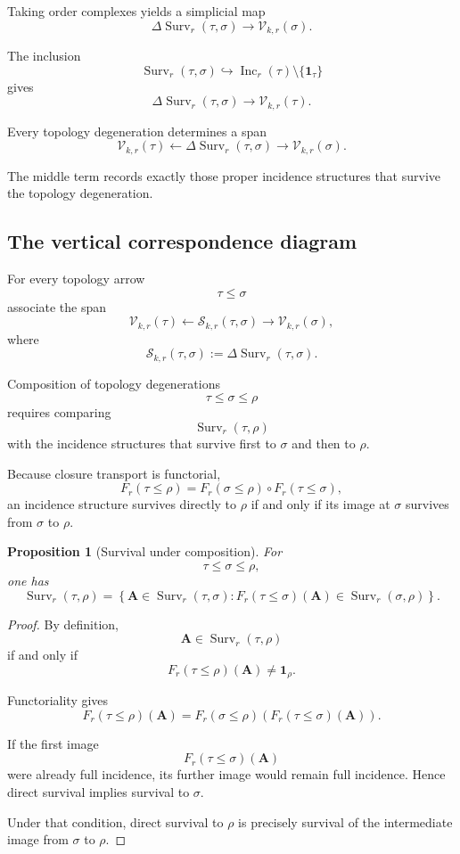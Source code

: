 \documentclass[11pt]{article}
\theoremstyle{plain}
\newtheorem{proposition}[theorem]{Proposition}
\theoremstyle{definition}
\begin{document}
Taking order complexes yields a simplicial map
\[
\Delta\operatorname{Surv}_r(\tau,\sigma)
\longrightarrow
\mathcal V_{k,r}(\sigma).
\]

The inclusion
\[
\operatorname{Surv}_r(\tau,\sigma)
\hookrightarrow
\operatorname{Inc}_r(\tau)
\setminus
\{\mathbf1_\tau\}
\]
gives
\[
\Delta\operatorname{Surv}_r(\tau,\sigma)
\longrightarrow
\mathcal V_{k,r}(\tau).
\]

Every topology degeneration determines a span
\[
\mathcal V_{k,r}(\tau)
\longleftarrow
\Delta\operatorname{Surv}_r(\tau,\sigma)
\longrightarrow
\mathcal V_{k,r}(\sigma).
\]

The middle term records exactly those proper incidence structures that survive the
topology degeneration.


\subsection{The vertical correspondence diagram}
\label{subsec:vertical-correspondence-diagram}


For every topology arrow
\[
\tau\leq\sigma
\]
associate the span
\[
\mathcal V_{k,r}(\tau)
\longleftarrow
\mathcal S_{k,r}(\tau,\sigma)
\longrightarrow
\mathcal V_{k,r}(\sigma),
\]
where
\[
\mathcal S_{k,r}(\tau,\sigma)
:=
\Delta
\operatorname{Surv}_r(\tau,\sigma).
\]

Composition of topology degenerations
\[
\tau\leq\sigma\leq\rho
\]
requires comparing
\[
\operatorname{Surv}_r(\tau,\rho)
\]
with the incidence structures that survive first to $\sigma$ and then
to $\rho$.

Because closure transport is functorial,
\[
F_r(\tau\leq\rho)
=
F_r(\sigma\leq\rho)
\circ
F_r(\tau\leq\sigma),
\]
an incidence structure survives directly to $\rho$ if and only if its
image at $\sigma$ survives from $\sigma$ to $\rho$.

\begin{proposition}[Survival under composition]
\label{prop:survival-composition}
For
\[
\tau\leq\sigma\leq\rho,
\]
one has
\[
\operatorname{Surv}_r(\tau,\rho)
=
\left\{
\mathbf A\in
\operatorname{Surv}_r(\tau,\sigma):
F_r(\tau\leq\sigma)(\mathbf A)
\in
\operatorname{Surv}_r(\sigma,\rho)
\right\}.
\]
\end{proposition}

\begin{proof}
By definition,
\[
\mathbf A\in
\operatorname{Surv}_r(\tau,\rho)
\]
if and only if
\[
F_r(\tau\leq\rho)(\mathbf A)
\neq
\mathbf1_\rho.
\]

Functoriality gives
\[
F_r(\tau\leq\rho)(\mathbf A)
=
F_r(\sigma\leq\rho)
\left(
F_r(\tau\leq\sigma)(\mathbf A)
\right).
\]

If the first image
\[
F_r(\tau\leq\sigma)(\mathbf A)
\]
were already full incidence, its further image would remain full
incidence.  Hence direct survival implies survival to $\sigma$.

Under that condition, direct survival to $\rho$ is precisely survival of
the intermediate image from $\sigma$ to $\rho$.
\end{proof}
\end{document}
